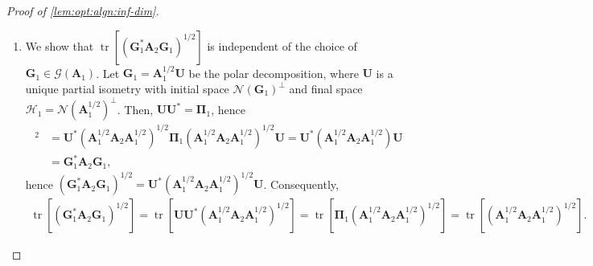 \documentclass[noinfoline]{imsart}\setcounter{tocdepth}{2}
\newcommand{\m}[1]{\mathbf{#1}} %
\renewcommand{\c}[1]{\mathcal{#1}} %
\DeclareMathOperator*{\tr}{tr}
\theoremstyle{plain}
\begin{document}
\begin{proof}[Proof of \cref{lem:opt:algn:inf-dim}] \quad
\begin{enumerate}[leftmargin=*]
\item [(Step 1)] We show that $\tr [(\m{G}_{1}^{*} \m{A}_{2} \m{G}_{1})^{1/2}]$ is independent of the choice of $\m{G}_{1} \in \c{G}(\m{A}_{1})$. Let $\m{G}_{1} = \m{A}_{1}^{1/2} \m{U}$ be the polar decomposition, where $\m{U}$ is a unique partial isometry with initial space $\c{N}(\m{G}_{1})^{\perp}$ and final space $\c{H}_{1} = \c{N}(\m{A}_{1}^{1/2})^{\perp}$. Then, $\m{U} \m{U}^{*} = \m{\Pi}_{1}$, hence
\begin{align*}
    [\m{U}^{*} (\m{A}_{1}^{1/2} \m{A}_{2} \m{A}_{1}^{1/2})^{1/2} \m{U}]^{2} &= \m{U}^{*} (\m{A}_{1}^{1/2} \m{A}_{2} \m{A}_{1}^{1/2})^{1/2} \m{\Pi}_{1} (\m{A}_{1}^{1/2} \m{A}_{2} \m{A}_{1}^{1/2})^{1/2} \m{U} = \m{U}^{*} (\m{A}_{1}^{1/2} \m{A}_{2} \m{A}_{1}^{1/2}) \m{U} \\
    &= \m{G}_{1}^{*} \m{A}_{2} \m{G}_{1},
\end{align*}
hence $(\m{G}_{1}^{*} \m{A}_{2} \m{G}_{1})^{1/2}= \m{U}^{*} (\m{A}_{1}^{1/2} \m{A}_{2} \m{A}_{1}^{1/2})^{1/2} \m{U}$. Consequently, 
\begin{align*}
    \tr [(\m{G}_{1}^{*} \m{A}_{2} \m{G}_{1})^{1/2}] = \tr [\m{U} \m{U}^{*} (\m{A}_{1}^{1/2} \m{A}_{2} \m{A}_{1}^{1/2})^{1/2}] = \tr [\m{\Pi}_{1} (\m{A}_{1}^{1/2} \m{A}_{2} \m{A}_{1}^{1/2})^{1/2}] =
    \tr [(\m{A}_{1}^{1/2} \m{A}_{2} \m{A}_{1}^{1/2})^{1/2}].
\end{align*}


\end{enumerate}
\end{proof}
\end{document}
